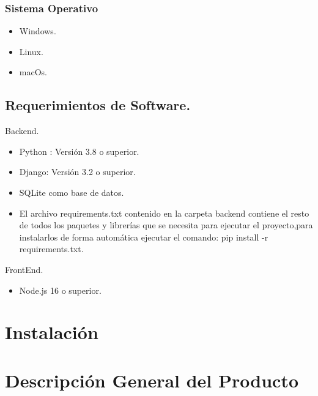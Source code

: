 \documentclass[a4paper,12pt]{article}
\begin{document}
\subsubsection{Sistema Operativo}
\begin{itemize}
    \item Windows.
    \item Linux.
    \item macOs.
\end{itemize}

\subsection{Requerimientos de Software.}
Backend.
\begin{itemize}
	\item Python : Versión 3.8 o superior.
	\item Django: Versión 3.2 o superior.
	\item SQLite como base de datos.
	\item El archivo requirements.txt contenido en la carpeta backend contiene el resto de todos los paquetes y librerías que se necesita para ejecutar el proyecto,para instalarlos de forma automática ejecutar el comando: pip install -r requirements.txt.
\end{itemize}
FrontEnd.
\begin{itemize}
	\item Node.js 16 o superior.
\end{itemize}

\section{Instalación}

\section{Descripción General del Producto}
\end{document}
